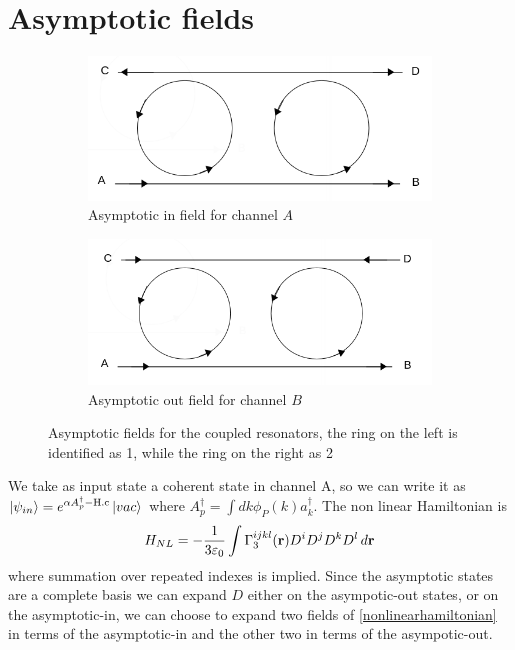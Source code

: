 \section{Asymptotic fields}
\begin{figure}[H]
\centering
\begin{subfigure}{0.5\textwidth}
\centering
\includegraphics[width = \textwidth]{img/Asyina2}
\caption{Asymptotic in field for channel $A$}
\end{subfigure}%
\begin{subfigure}{0.5\textwidth}
\includegraphics[width = \textwidth]{img/Asyoutb2}
\caption{Asymptotic out field for channel $B$}
\end{subfigure}
\caption{Asymptotic fields for the coupled resonators, the ring on the left is identified as 1, while the ring on the right as 2}\label{asyfields}
\end{figure}
We take as input state a coherent state in channel A, so we can write it as $\ket{\psi_{in}} = e^{\alpha A_p^\dagger - \text{H.c}}\ket{vac}$ where $A_p^\dagger = \int dk \phi_P(k) a_k^\dagger$. The non linear Hamiltonian is \cite{Sipe2004}
\begin{equation}\label{nonlinearhamiltonian}H_{NL} = -\frac{1}{3\varepsilon_0}\int\Gamma^{ijkl}_3(\mathbf{r})D^iD^jD^kD^l\,d\mathbf{r}\end{equation}
where summation over repeated indexes is implied. Since the asymptotic states are a complete basis we can expand $D$ either on the asympotic-out states, or on the asymptotic-in, we can choose to expand two fields of \eqref{nonlinearhamiltonian} in terms of the asymptotic-in and the other two in terms of the asympotic-out.
